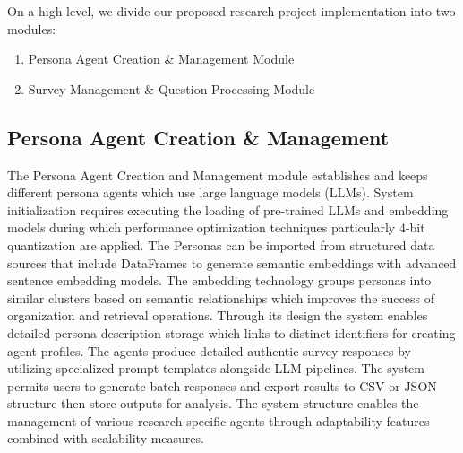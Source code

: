 \documentclass[11pt]{article}
\begin{document}
On a high level, we divide our proposed research project implementation into two modules: 
\begin{enumerate}
    \item Persona Agent Creation \& Management Module
    \item Survey Management \& Question Processing Module
\end{enumerate}
\subsection{Persona Agent Creation \& Management}
The Persona Agent Creation and Management module establishes and keeps different persona agents which use large language models (LLMs). System initialization requires executing the loading of pre-trained LLMs and embedding models during which performance optimization techniques particularly 4-bit quantization are applied. The Personas can be imported from structured data sources that include DataFrames to generate semantic embeddings with advanced sentence embedding models. The embedding technology groups personas into similar clusters based on semantic relationships which improves the success of organization and retrieval operations. Through its design the system enables detailed persona description storage which links to distinct identifiers for creating agent profiles. The agents produce detailed authentic survey responses by utilizing specialized prompt templates alongside LLM pipelines. The system permits users to generate batch responses and export results to CSV or JSON structure then store outputs for analysis. The system structure enables the management of various research-specific agents through adaptability features combined with scalability measures.
\end{document}
